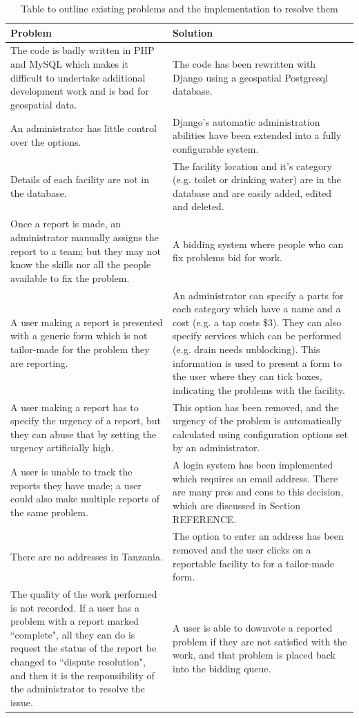 \begin{table}[H]
\centering
\begin{tabular}{p{5.7cm}|p{5.7cm}}
\textbf{Problem} & \textbf{Solution} \\
\hline
The code is badly written in PHP and MySQL which makes it difficult to undertake additional development work and is bad for geospatial data.
  & The code has been rewritten with Django using a geospatial Postgresql database. \\
\hline
An administrator has little control over the options.
  & Django's automatic administration abilities have been extended into a fully configurable system. \\
\hline
Details of each facility are not in the database.
  & The facility location and it's category (e.g. toilet or drinking water) are in the database and are easily added, edited and deleted. \\
\hline
Once a report is made, an administrator manually assigns the report to a team; but they may not know the skills nor all the people available to fix the problem.
  & A bidding system where people who can fix problems bid for work. \\
\hline
A user making a report is presented with a generic form which is not tailor-made for the problem they are reporting.
  & An administrator can specify a parts for each category which have a name and a cost (e.g. a tap costs \$3). They can also specify services which can be performed (e.g. drain needs unblocking). This information is used to present a form to the user where they can tick boxes, indicating the problems with the facility. \\
\hline
A user making a report has to specify the urgency of a report, but they can abuse that by setting the urgency artificially high.
  & This option has been removed, and the urgency of the problem is automatically calculated using configuration options set by an administrator. \\
\hline
A user is unable to track the reports they have made; a user could also make multiple reports of the same problem.
  & A login system has been implemented which requires an email address. There are many pros and cons to this decision, which are discussed in Section REFERENCE. \\
There are no addresses in Tanzania.
  & The option to enter an address has been removed and the user clicks on a reportable facility to for a tailor-made form. \\
\hline
The quality of the work performed is not recorded. If a user has a problem with a report marked ``complete", all they can do is request the status of the report be changed to ``dispute resolution", and then it is the responsibility of the administrator to resolve the issue.
  & A user is able to downvote a reported problem if they are not satisfied with the work, and that problem is placed back into the bidding queue.
\end{tabular}
\caption{Table to outline existing problems and the implementation to resolve them}
\label{tab:problems}
\end{table}

